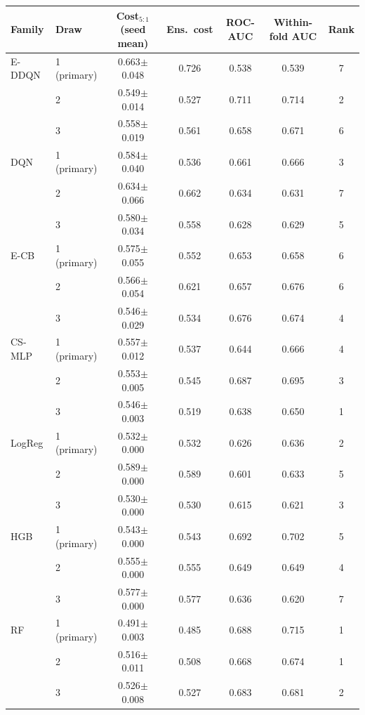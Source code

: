 \begin{tabular}{llccccc}
\toprule
Family & Draw & Cost$_{5:1}$ (seed mean) & Ens.\ cost & ROC-AUC & Within-fold AUC & Rank \\
\midrule
E-DDQN & 1 (primary) & 0.663$\pm$0.048 & 0.726 & 0.538 & 0.539 & 7 \\
 & 2 & 0.549$\pm$0.014 & 0.527 & 0.711 & 0.714 & 2 \\
 & 3 & 0.558$\pm$0.019 & 0.561 & 0.658 & 0.671 & 6 \\
\addlinespace[2pt]
DQN & 1 (primary) & 0.584$\pm$0.040 & 0.536 & 0.661 & 0.666 & 3 \\
 & 2 & 0.634$\pm$0.066 & 0.662 & 0.634 & 0.631 & 7 \\
 & 3 & 0.580$\pm$0.034 & 0.558 & 0.628 & 0.629 & 5 \\
\addlinespace[2pt]
E-CB & 1 (primary) & 0.575$\pm$0.055 & 0.552 & 0.653 & 0.658 & 6 \\
 & 2 & 0.566$\pm$0.054 & 0.621 & 0.657 & 0.676 & 6 \\
 & 3 & 0.546$\pm$0.029 & 0.534 & 0.676 & 0.674 & 4 \\
\addlinespace[2pt]
CS-MLP & 1 (primary) & 0.557$\pm$0.012 & 0.537 & 0.644 & 0.666 & 4 \\
 & 2 & 0.553$\pm$0.005 & 0.545 & 0.687 & 0.695 & 3 \\
 & 3 & 0.546$\pm$0.003 & 0.519 & 0.638 & 0.650 & 1 \\
\addlinespace[2pt]
LogReg & 1 (primary) & 0.532$\pm$0.000 & 0.532 & 0.626 & 0.636 & 2 \\
 & 2 & 0.589$\pm$0.000 & 0.589 & 0.601 & 0.633 & 5 \\
 & 3 & 0.530$\pm$0.000 & 0.530 & 0.615 & 0.621 & 3 \\
\addlinespace[2pt]
HGB & 1 (primary) & 0.543$\pm$0.000 & 0.543 & 0.692 & 0.702 & 5 \\
 & 2 & 0.555$\pm$0.000 & 0.555 & 0.649 & 0.649 & 4 \\
 & 3 & 0.577$\pm$0.000 & 0.577 & 0.636 & 0.620 & 7 \\
\addlinespace[2pt]
RF & 1 (primary) & 0.491$\pm$0.003 & 0.485 & 0.688 & 0.715 & 1 \\
 & 2 & 0.516$\pm$0.011 & 0.508 & 0.668 & 0.674 & 1 \\
 & 3 & 0.526$\pm$0.008 & 0.527 & 0.683 & 0.681 & 2 \\
\bottomrule
\end{tabular}
